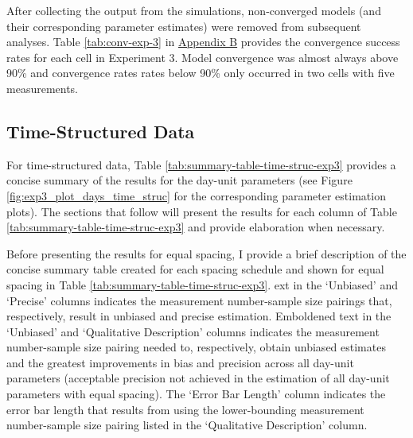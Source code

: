 \documentclass[
12pt, %
twoside,
english]{guelphthesis}
\begin{document}
After collecting the output from the simulations, non-converged models
(and their corresponding parameter estimates) were removed from
subsequent analyses. Table \ref{tab:conv-exp-3} in \protect\hyperlink{appendix-a-convergence-rates}{Appendix B} provides the convergence
success rates for each cell in Experiment 3. Model convergence was almost always above 90\% and convergence rates
rates below 90\% only occurred in two cells with five measurements.

\hypertarget{concise-example-exp3}{%
\subsection{Time-Structured Data}\label{concise-example-exp3}}

For time-structured data, Table \ref{tab:summary-table-time-struc-exp3} provides a concise summary of the results for the day-unit parameters (see Figure \ref{fig:exp3_plot_days_time_struc} for the corresponding parameter estimation plots). The sections that follow will present the results for each column of Table \ref{tab:summary-table-time-struc-exp3} and provide elaboration when necessary.

Before presenting the results for equal spacing, I provide a brief description of the concise summary table created for each spacing schedule and shown for equal spacing in Table \ref{tab:summary-table-time-struc-exp3}. ext in the `Unbiased' and `Precise' columns indicates the measurement number-sample size pairings that, respectively, result in unbiased and precise estimation. Emboldened text in the `Unbiased' and `Qualitative Description' columns indicates the measurement number-sample size pairing needed to, respectively, obtain unbiased estimates and the greatest improvements in bias and precision across all day-unit parameters (acceptable precision not achieved in the estimation of all day-unit parameters with equal spacing). The `Error Bar Length' column indicates the error bar length that results from using the lower-bounding measurement number-sample size pairing listed in the `Qualitative Description' column.
\end{document}
